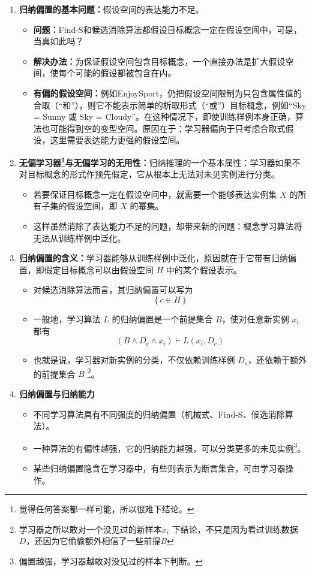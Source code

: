 \documentclass[../main.tex]{subfiles}
\begin{document}
\begin{enumerate}
    \item \textbf{归纳偏置的基本问题：}假设空间的表达能力不足。
    {\small\kaishu
    \begin{itemize}
        \item \textbf{问题：}Find-S和候选消除算法都假设目标概念一定在假设空间中，可是，当真如此吗？
        \item \textbf{解决办法：}为保证假设空间包含目标概念，一个直接办法是扩大假设空间，使每个可能的假设都被包含在内。
        \item \textbf{有偏的假设空间：}例如EnjoySport，仍把假设空间限制为只包含属性值的合取（“和”），则它不能表示简单的析取形式（“或”）目标概念，例如“Sky = Sunny 或 Sky = Cloudy”。在这种情况下，即使训练样例本身正确，算法也可能得到空的变型空间。原因在于：学习器偏向于只考虑合取式假设，这里需要表达能力更强的假设空间。
    \end{itemize}
    }
    \item \textbf{无偏学习器\footnote{觉得任何答案都一样可能，所以很难下结论。}与无偏学习的无用性：}归纳推理的一个基本属性：学习器如果不对目标概念的形式作预先假定，它从根本上无法对未见实例进行分类。
    {\small\kaishu
    \begin{itemize}
        \item 若要保证目标概念一定在假设空间中，就需要一个能够表达实例集 $X$ 的所有子集的假设空间，即 $X$ 的幂集。
        \item 这样虽然消除了表达能力不足的问题，却带来新的问题：概念学习算法将无法从训练样例中泛化。
    \end{itemize}
    }
    \item \textbf{归纳偏置的含义：}学习器能够从训练样例中泛化，原因就在于它带有归纳偏置，即假定目标概念可以由假设空间 $H$ 中的某个假设表示。
    {\small\kaishu
    \begin{itemize}
        \item 对候选消除算法而言，其归纳偏置可以写为
        \[
            \{\,c \in H\,\}
        \]
        \item 一般地，学习算法 $L$ 的归纳偏置是一个前提集合 $B$，使对任意新实例 $x_i$ 都有
        \[
            (B \land D_c \land x_i)\vdash L(x_i,D_c)
        \]
        \item 也就是说，学习器对新实例的分类，不仅依赖训练样例 $D_c$，还依赖于额外的前提集合 $B$ \footnote{学习器之所以敢对一个没见过的新样本$x_i$
下结论，不只是因为看过训练数据 $D$，还因为它偷偷额外相信了一些前提$B$}。
    \end{itemize}
    }
    \item \textbf{归纳偏置与归纳能力}
    \begin{itemize}
        \item 不同学习算法具有不同强度的归纳偏置（机械式、Find-S、候选消除算法）。
        \item 一种算法的有偏性越强，它的归纳能力越强，可以分类更多的未见实例\footnote{偏置越强，学习器越敢对没见过的样本下判断。}。
        \item 某些归纳偏置隐含在学习器中，有些则表示为断言集合，可由学习器操作。
    \end{itemize}
\end{enumerate}
\end{document}
